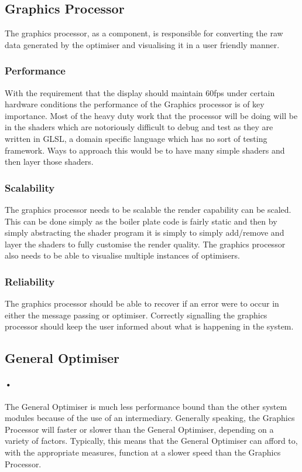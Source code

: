 \documentclass[11pt]{article}
\begin{document}
\subsection{Graphics Processor}
The graphics processor, as a component, is responsible for converting the raw data generated by the optimiser and visualising it in a user friendly manner.
\subsubsection{Performance}
With the requirement that the display should maintain 60fps under certain hardware conditions the performance of the Graphics processor is of key importance. Most of the heavy duty work that the processor will be doing will be in the shaders which are notoriously difficult to debug and test as they are written in GLSL, a domain specific language which has no sort of testing framework. Ways to approach this would be to have many simple shaders and then layer those shaders.
\subsubsection{Scalability}
The graphics processor needs to be scalable the render capability can be scaled. This can be done simply as the boiler plate code is fairly static and then by simply abstracting the shader program it is simply to simply add/remove and layer the shaders to fully customise the render quality. The graphics processor also needs to be able to visualise multiple instances of optimisers. 
\subsubsection{Reliability}
The graphics processor should be able to recover if an error were to occur in either the message passing or optimiser. Correctly signalling the graphics processor should keep the user informed about what is happening in the system.
\subsection{General Optimiser}
\paragraph{•}
The General Optimiser is much less performance bound than the other system modules because of the use of an intermediary. Generally speaking, the Graphics Processor will faster or slower than the General Optimiser, depending on a variety of factors. Typically, this means that the General Optimiser can afford to, with the appropriate measures, function at a slower speed than the Graphics Processor.
\end{document}
